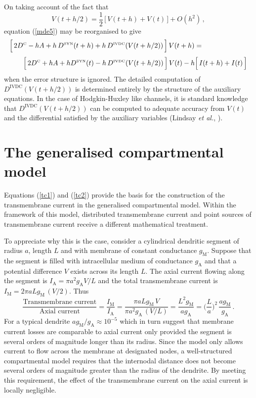 On taking account of the fact that
\[
V(t+h/2)=\frac{1}{2} \,\Big[\,V(t+h)+V(t)\,\Big]+O(h^2)\,,
\]
equation (\ref{mde5}) may be reorganised to give
\begin{equation}\label{mde6}
\begin{array}{l}
\displaystyle\Big[\,2 D^{\mbox{\tiny C}}-hA+h\,D^{\mbox{\tiny SYN}}(t+h)
+h\,D^{\mbox{\tiny IVDC}}(V(t+h/2))\,\Big]\,V(t+h) = \\[10pt]
\qquad\displaystyle\Big[\,2 D^{\mbox{\tiny C}}+hA+h D^{\mbox{\tiny SYN}}(t)
-h\,D^{\mbox{\tiny IVDC}}(V(t+h/2))\,\Big]\,V(t)
-h\Big[\,I(t+h)+I(t)\,\Big]
\end{array}
\end{equation}
when the error structure is ignored. The detailed computation of
$D^\mathrm{IVDC}(V(t+h/2))$ is determined entirely by the
structure of the auxiliary equations. In the case of
Hodgkin-Huxley like channels, it is standard knowledge that
$D^\mathrm{IVDC}(V(t+h/2))$ can be computed to adequate accuracy
from $V(t)$ and the differential satisfied by the auxiliary
variables (Lindsay \emph{et al.}, \cite{Lindsay01a}).

\section{The generalised compartmental model}
Equations (\ref{tc1}) and (\ref{tc2}) provide the basis for the
construction of the transmembrane current in the generalised
compartmental model. Within the framework of this model,
distributed transmembrane current and point sources of
transmembrane current receive a different mathematical treatment.

To appreciate why this is the case, consider a cylindrical
dendritic segment of radius $a$, length $L$ and with membrane of
constant conductance $g_\mathrm{M}$. Suppose that the segment is
filled with intracellular medium of conductance $g_\mathrm{A}$ and
that a potential difference $V$ exists across its length $L$. The
axial current flowing along the segment is $I_\mathrm{A}=\pi a^2
g_\mathrm{A} V/L$ and the total transmembrane current is
$I_\mathrm{M}=2\pi a L g_\mathrm{M}\,(V/2)$. Thus
\begin{equation}\label{pc1}
\frac{\mbox{Transmembrane current}}{\mbox{Axial current}}
=\frac{I_\mathrm{M}}{I_\mathrm{A}}=\frac{\pi a L g_\mathrm{M}\,V}
{\pi a^2 g_\mathrm{A}\,(V/L)}=\frac{L^2 g_\mathrm{M}}
{a g_\mathrm{A}}=\Big(\frac{L}{a}\Big)^2\,
\frac{a g_\mathrm{M}}{g_\mathrm{A}}\,.
\end{equation}
For a typical dendrite $a g_\mathrm{M}/g_\mathrm{A}\approx
10^{-5}$ which in turn suggest that membrane current losses are
comparable to axial current only provided the segment is several
orders of magnitude longer than its radius. Since the model only
allows current to flow across the membrane at designated nodes, a
well-structured compartmental model requires that the internodal
distance does not become several orders of magnitude greater than
the radius of the dendrite. By meeting this requirement, the
effect of the transmembrane current on the axial current is
locally negligible.

